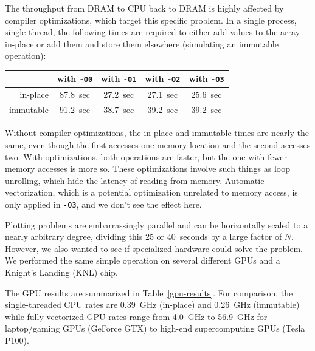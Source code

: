 \documentclass[12pt]{article}
\begin{document}
The throughput from DRAM to CPU back to DRAM is highly affected by compiler optimizations, which target this specific problem. In a single process, single thread, the following times are required to either add values to the array in-place or add them and store them elsewhere (simulating an immutable operation):

\begin{center}
\begin{tabular}{r | c c c c}
           & with {\tt -O0} & with {\tt -O1} & with {\tt -O2} & with {\tt -O3} \\\hline
in-place   & 87.8~sec       & 27.2~sec       & 27.1~sec       & 25.6~sec       \\
immutable  & 91.2~sec       & 38.7~sec       & 39.2~sec       & 39.2~sec       \\
\end{tabular}
\end{center}

Without compiler optimizations, the in-place and immutable times are nearly the same, even though the first accesses one memory location and the second accesses two. With optimizations, both operations are faster, but the one with fewer memory accesses is more so. These optimizations involve such things as loop unrolling, which hide the latency of reading from memory. Automatic vectorization, which is a potential optimization unrelated to memory access, is only applied in {\tt -O3}, and we don't see the effect here.

Plotting problems are embarrassingly parallel and can be horizontally scaled to a nearly arbitrary degree, dividing this 25 or 40~seconds by a large factor of $N$. However, we also wanted to see if specialized hardware could solve the problem. We performed the same simple operation on several different GPUs and a Knight's Landing (KNL) chip.

The GPU results are summarized in Table~\ref{gpu-results}. For comparison, the single-threaded CPU rates are 0.39~GHz (in-place) and 0.26~GHz (immutable) while fully vectorized GPU rates range from 4.0~GHz to 56.9~GHz for laptop/gaming GPUs (GeForce GTX) to high-end supercomputing GPUs (Tesla P100).
\end{document}
